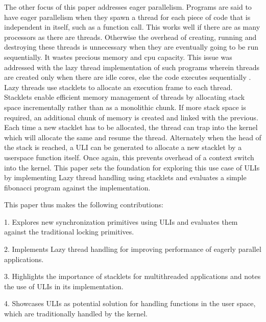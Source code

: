 The other focus of this paper addresses eager parallelism. Programs are said
to have eager parallelism when they spawn a thread for each piece of code that
is independent in itself, such as a function call. This works well if there are
as many processors as there are threads. Otherwise the overhead of creating,
running and destroying these threads is unnecessary when they are eventually
going to be run sequentially. It wastes precious memory and cpu capacity. This
issue was addressed with the lazy thread implementation of such programs wherein
threads are created only when there are idle cores, else the code executes
sequentially \cite{goldstein}. Lazy threads use stacklets to allocate an execution frame to each
thread. Stacklets enable efficient memory management of threads by allocating
stack space incrementally rather than as a monolithic chunk. If more stack space
is required, an additional chunk of memory is created and linked with the
previous. Each time a new stacklet has to be allocated, the thread can trap into
the kernel which will allocate the same and resume the thread. Alternately when
the head of the stack is reached, a ULI can be generated to allocate a new
stacklet by a userspace function itself. Once again, this prevents overhead of a
context switch into the kernel. This paper sets the foundation for exploring
this use case of ULIs by implementing Lazy thread handling using stacklets and
evaluates a simple fibonacci program against the implementation.

This paper thus makes the following contributions:

1. Explores new synchronization primitives using ULIs and evaluates them against
the traditional locking primitives.

2. Implements Lazy thread handling for improving performance of eagerly parallel
applications.

3. Highlights the importance of stacklets for multithreaded applications and
notes the use of ULIs in its implementation.

4. Showcases ULIs as potential solution for handling functions in the user space,
which are traditionally handled by the kernel.
